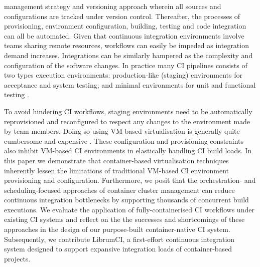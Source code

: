 \documentclass{report}
\begin{document}
management strategy and versioning approach wherein all sources
and configurations are tracked under version control. Thereafter,
the processes of provisioning, environment configuration, building, testing and code integration
can all be automated. Given that continuous integration environments involve
teams sharing remote resources, workflows can easily 
be impeded as integration demand increases. Integrations can be similarly
hampered as the complexity and configuration of the software changes.
In practice many CI pipelines consists of two types execution environments:
production-like (staging) environments for acceptance and system testing; and minimal 
environments for unit and functional testing \citep{Guimaraes, Duvall}. 
\par
To avoid hindering CI workflows, staging environments need to be automatically 
reprovisioned and reconfigured to respect any changes to the environment made by team members.
Doing so using VM-based virtualisation is generally quite cumbersome and expensive \citep{Gambi}.
These configuration and provisioning constraints also inhibit
VM-based CI environments in elastically handling CI build loads. 
In this paper we demonstrate that container-based virtualisation
techniques inherently lessen the limitations of traditional VM-based CI environment
provisioning and configuration. Furthermore, we posit that
the orchestration- and scheduling-focused approaches of  
container cluster management can reduce continuous
integration bottlenecks by supporting thousands of concurrent build executions.
We evaluate the application of fully-containerised CI workflows under existing CI systems 
and reflect on the the successes and shortcomings of these approaches in the design of our purpose-built container-native
CI system. Subsequently, we contribute LibrumCI, a first-effort continuous integration system designed 
to support expansive integration loads of container-based projects. 
\end{document}
